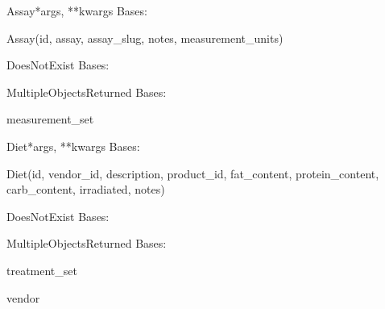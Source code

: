 \documentclass[letterpaper,10pt,english]{sphinxmanual}
\begin{document}
\hypertarget{data.models.Assay}{}\begin{classdesc}{Assay}{*args, **kwargs}
Bases: 

Assay(id, assay, assay\_slug, notes, measurement\_units)

\hypertarget{data.models.Assay.DoesNotExist}{}\begin{excdesc}{DoesNotExist}
Bases: 
\end{excdesc}

\hypertarget{data.models.Assay.MultipleObjectsReturned}{}\begin{excdesc}{MultipleObjectsReturned}
Bases: 
\end{excdesc}

\hypertarget{data.models.Assay.measurement\_set}{}\begin{memberdesc}[Assay]{measurement\_set}\end{memberdesc}
\end{classdesc}

\hypertarget{data.models.Diet}{}\begin{classdesc}{Diet}{*args, **kwargs}
Bases: 

Diet(id, vendor\_id, description, product\_id, fat\_content, protein\_content, carb\_content, irradiated, notes)

\hypertarget{data.models.Diet.DoesNotExist}{}\begin{excdesc}{DoesNotExist}
Bases: 
\end{excdesc}

\hypertarget{data.models.Diet.MultipleObjectsReturned}{}\begin{excdesc}{MultipleObjectsReturned}
Bases: 
\end{excdesc}

\hypertarget{data.models.Diet.treatment\_set}{}\begin{memberdesc}[Diet]{treatment\_set}\end{memberdesc}

\hypertarget{data.models.Diet.vendor}{}\begin{memberdesc}[Diet]{vendor}\end{memberdesc}
\end{classdesc}
\end{document}
